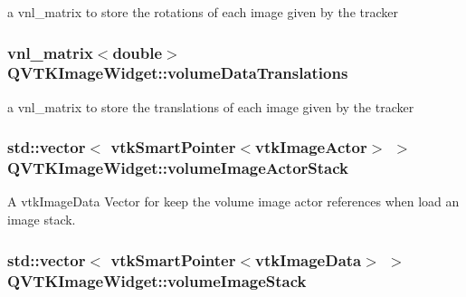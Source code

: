 a vnl\-\_\-matrix to store the rotations of each image given by the tracker 

\hypertarget{class_q_v_t_k_image_widget_a039e71a63cbbba8d95894df141fa6986}{
\subsubsection[{volume\-Data\-Translations}]{\setlength{\rightskip}{0pt plus 5cm}vnl\-\_\-matrix$<$double$>$ {\bf Q\-V\-T\-K\-Image\-Widget\-::volume\-Data\-Translations}}}\label{d8/dd7/class_q_v_t_k_image_widget_a039e71a63cbbba8d95894df141fa6986}


a vnl\-\_\-matrix to store the translations of each image given by the tracker 

\hypertarget{class_q_v_t_k_image_widget_a0cdd7ea88a31d89a60352c27dc8bd556}{
\subsubsection[{volume\-Image\-Actor\-Stack}]{\setlength{\rightskip}{0pt plus 5cm}std\-::vector$<$ vtk\-Smart\-Pointer$<$vtk\-Image\-Actor$>$ $>$ {\bf Q\-V\-T\-K\-Image\-Widget\-::volume\-Image\-Actor\-Stack}}}\label{d8/dd7/class_q_v_t_k_image_widget_a0cdd7ea88a31d89a60352c27dc8bd556}


A vtk\-Image\-Data Vector for keep the volume image actor references when load an image stack. 

\hypertarget{class_q_v_t_k_image_widget_a2b96df48cde8c89ddb4a2a76c0b619c3}{
\subsubsection[{volume\-Image\-Stack}]{\setlength{\rightskip}{0pt plus 5cm}std\-::vector$<$ vtk\-Smart\-Pointer$<$vtk\-Image\-Data$>$ $>$ {\bf Q\-V\-T\-K\-Image\-Widget\-::volume\-Image\-Stack}}}\label{d8/dd7/class_q_v_t_k_image_widget_a2b96df48cde8c89ddb4a2a76c0b619c3}


